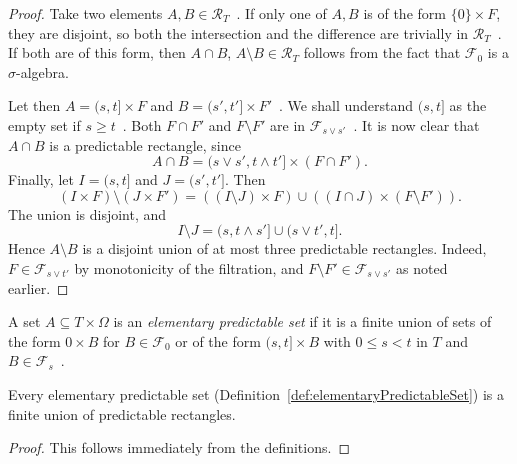 \begin{proof} \leanok
  Take two elements $A, B \in \mathcal{R}_T$~.
  If only one of $A, B$ is of the form $\{0\} \times F$,
  they are disjoint, so both the intersection and the difference
  are trivially in $\mathcal{R}_T$~.
  If both are of this form, then $A\cap B$, $A\setminus B\in\mathcal{R}_T$
  follows from the fact that $\mathcal{F}_0$ is a $\sigma$-algebra.

  Let then $A=(s, t] \times F$ and $B=(s', t'] \times F'$~.
  We shall understand $(s,t]$ as the empty set if $s \ge t$~.
  Both $F \cap F'$ and $F \setminus F'$ are in $\mathcal{F}_{s \vee s'}$~.
  It is now clear that $A\cap B$ is a predictable rectangle, since
  \[
  A \cap B
  =
  (s \vee s', t \wedge t'] \times (F \cap F').
  \]
  Finally, let $I=(s,t]$ and $J=(s',t']$. Then
  \[
    (I\times F)\setminus(J\times F')
    =
    ((I\setminus J)\times F)
    \cup
    ((I\cap J)\times(F\setminus F')).
  \]
  The union is disjoint, and
  \[
    I\setminus J
    =
    (s,t\wedge s']\cup(s\vee t',t].
  \]
  Hence $A\setminus B$ is a disjoint union of at most three predictable
  rectangles. Indeed, $F\in\mathcal{F}_{s\vee t'}$ by monotonicity of the
  filtration, and $F\setminus F'\in\mathcal{F}_{s\vee s'}$ as noted earlier.
\end{proof}

\begin{definition}\label{def:elementaryPredictableSet}
  \leanok
A set $A \subseteq T \times \Omega$ is an \emph{elementary predictable set} if it is a finite union of sets of the form ${0} \times B$ for $B \in \mathcal{F}_0$ or of the form $(s, t] \times B$ with $0 \le s < t$ in $T$ and $B \in \mathcal{F}_s$~.
\end{definition}


\begin{lemma}\label{lem:predictableRectangles_generate_elementaryPredictableSets}
  \leanok
  Every elementary predictable set (Definition~\ref{def:elementaryPredictableSet})
  is a finite union of predictable rectangles.
\end{lemma}

\begin{proof}\leanok
  This follows immediately from the definitions.
\end{proof}

